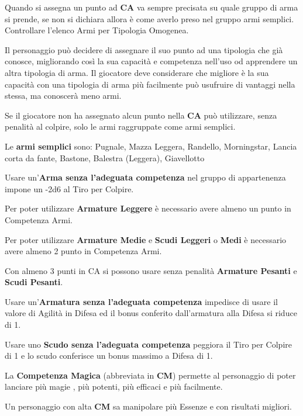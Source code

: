 \documentclass[a4paper,11pt,twoside,openany]{book}
\begin{document}
Quando si assegna un punto ad \textbf{CA} va sempre precisata su quale gruppo di arma si prende, se non si dichiara allora è come averlo preso nel gruppo armi semplici.
Controllare l'elenco Armi per Tipologia Omogenea.

Il personaggio può decidere di assegnare il suo punto ad una tipologia che già conosce, migliorando così la sua capacità e competenza nell'uso od apprendere un altra tipologia di arma.
Il giocatore deve considerare che migliore è la sua capacità con una tipologia di arma più facilmente può usufruire di vantaggi nella stessa, ma conoscerà meno armi.

Se il giocatore non ha assegnato alcun punto nella \textbf{CA} può utilizzare, senza penalità al colpire, solo le armi raggruppate come armi semplici.

Le \textbf{armi semplici} sono: Pugnale, Mazza Leggera, Randello, Morningstar,
Lancia corta da fante, Bastone, Balestra (Leggera), Giavellotto

Usare un'\textbf{Arma senza l'adeguata competenza} nel gruppo di appartenenza impone un -2d6 al Tiro per Colpire.

Per poter utilizzare \textbf{Armature Leggere} è necessario avere almeno un punto in Competenza Armi.

Per poter utilizzare \textbf{Armature Medie} e \textbf{Scudi Leggeri} o \textbf{Medi} è necessario avere almeno 2 punto in Competenza Armi.

Con almeno 3 punti in CA si possono usare senza penalità \textbf{Armature Pesanti} e \textbf{Scudi Pesanti}.

Usare un'\textbf{Armatura senza l'adeguata competenza} impedisce di usare il valore di Agilità in Difesa ed il bonus conferito dall'armatura alla Difesa si riduce di 1.

Usare uno \textbf{Scudo senza l'adeguata competenza} peggiora il Tiro per Colpire di 1 e lo scudo conferisce un bonus massimo a Difesa di 1.

La \textbf{Competenza Magica} (abbreviata in \textbf{CM}) permette al personaggio di poter lanciare più magie , più potenti, più efficaci e più facilmente.

Un personaggio con alta \textbf{CM} sa manipolare più Essenze e con risultati migliori.
\end{document}
